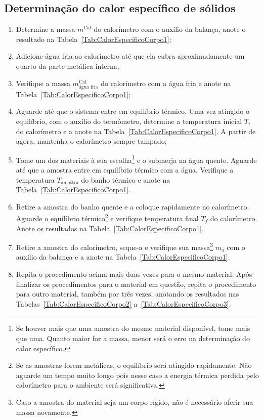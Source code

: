 \subsection{Determinação do calor específico de sólidos}

\begin{enumerate}
	\item Determine a massa $m^{\text{Cal}}$ do calorímetro com o auxílio da balança, anote o resultado na Tabela~\ref{Tab:CalorEspecificoCorpo1};
	\item Adicione água fria ao calorímetro até que ela cubra aproximadamente um quarto da parte metálica interna;
	\item Verifique a massa $m^{\text{Cal}}_{\text{água fria}}$ do calorímetro com a água fria e anote na Tabela~\ref{Tab:CalorEspecificoCorpo1};
	\item Aguarde até que o sistema entre em equilíbrio térmico. Uma vez atingido o equilíbrio, com o auxílio do termômetro, determine a temperatura inicial $T_i$ do calorímetro e a anote na Tabela~\ref{Tab:CalorEspecificoCorpo1}. A partir de agora, mantenha o calorímetro sempre tampado;
	\item Tome um dos materiais à sua escolha\footnote{Se houver mais que uma amostra do mesmo material disponível, tome mais que uma. Quanto maior for a massa, menor será o erro na determinação do calor específico.} e o submerja na água quente. Aguarde até que a amostra entre em equilíbrio térmico com a água. Verifique a temperatura $T_{\text{amostra}}$ do banho térmico e anote na Tabela~\ref{Tab:CalorEspecificoCorpo1}.
	\item Retire a amostra do banho quente e a coloque rapidamente no calorímetro. Aguarde o equilíbrio térmico\footnote{Se as amostras forem metálicas, o equilíbrio será atingido rapidamente. Não aguarde um tempo muito longo pois nesse caso a energia térmica perdida pelo calorímetro para o ambiente será significativa.} e verifique temperatura final $T_f$ do calorímetro. Anote os resultados na Tabela~\ref{Tab:CalorEspecificoCorpo1}.
	\item Retire a amostra do calorímetro, seque-a e verifique sua massa\footnote{Caso a amostra do material seja um corpo rígido, não é necessário aferir sua massa novamente.} $m_{\text{a}}$ com o auxílio da balança e a anote na Tabela~\ref{Tab:CalorEspecificoCorpo1}.
	\item Repita o procedimento acima mais duas vezes para o mesmo material. Após finalizar os procedimentos para o material em questão, repita o procedimento para outro material, também por três vezes, anotando os resultados nas Tabelas~\ref{Tab:CalorEspecificoCorpo2} a~\ref{Tab:CalorEspecificoCorpo3}.
\end{enumerate}

